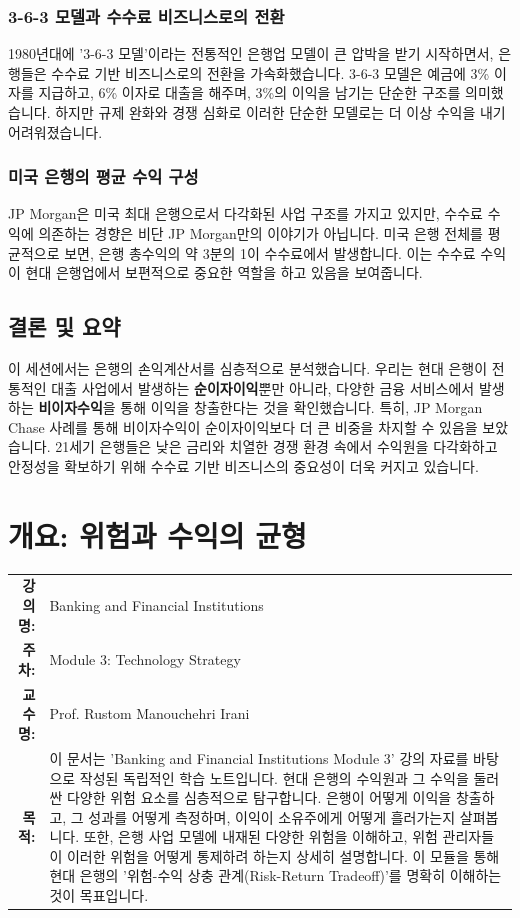 \documentclass[11pt,a4paper]{book}
\makeatletter
\theoremstyle{definition}
\newcommand{\metainfo}[4]{
\begin{tcolorbox}[
    colback=lightpurple,
    colframe=darkpurple,
    boxrule=1pt,
    arc=2mm,
    left=10pt,
    right=10pt,
    top=8pt,
    bottom=8pt
]
\begin{tabular}{@{}rl@{}}
\textbf{강의명:} & #1 \\[0.3em]
\textbf{주차:} & #2 \\[0.3em]
\textbf{교수명:} & #3 \\[0.3em]
\textbf{목적:} & \begin{minipage}[t]{0.75\textwidth}#4\end{minipage}
\end{tabular}
\end{tcolorbox}
}
\makeatother
\begin{document}
\subsection{3-6-3 모델과 수수료 비즈니스로의 전환}

1980년대에 '3-6-3 모델'이라는 전통적인 은행업 모델이 큰 압박을 받기 시작하면서, 은행들은 수수료 기반 비즈니스로의 전환을 가속화했습니다. 3-6-3 모델은 예금에 3\% 이자를 지급하고, 6\% 이자로 대출을 해주며, 3\%의 이익을 남기는 단순한 구조를 의미했습니다. 하지만 규제 완화와 경쟁 심화로 이러한 단순한 모델로는 더 이상 수익을 내기 어려워졌습니다.

\subsection{미국 은행의 평균 수익 구성}

JP Morgan은 미국 최대 은행으로서 다각화된 사업 구조를 가지고 있지만, 수수료 수익에 의존하는 경향은 비단 JP Morgan만의 이야기가 아닙니다. 미국 은행 전체를 평균적으로 보면, 은행 총수익의 약 3분의 1이 수수료에서 발생합니다. 이는 수수료 수익이 현대 은행업에서 보편적으로 중요한 역할을 하고 있음을 보여줍니다.


\section{결론 및 요약}

\begin{summarybox}[title={핵심 정리}]
이 세션에서는 은행의 손익계산서를 심층적으로 분석했습니다. 우리는 현대 은행이 전통적인 대출 사업에서 발생하는 \textbf{순이자이익}뿐만 아니라, 다양한 금융 서비스에서 발생하는 \textbf{비이자수익}을 통해 이익을 창출한다는 것을 확인했습니다. 특히, JP Morgan Chase 사례를 통해 비이자수익이 순이자이익보다 더 큰 비중을 차지할 수 있음을 보았습니다. 21세기 은행들은 낮은 금리와 치열한 경쟁 환경 속에서 수익원을 다각화하고 안정성을 확보하기 위해 수수료 기반 비즈니스의 중요성이 더욱 커지고 있습니다.
\end{summarybox}


\chapter{개요: 위험과 수익의 균형}
\label{ch:module3}

\metainfo{Banking and Financial Institutions}{Module 3: Technology Strategy}{Prof. Rustom Manouchehri Irani}{이 문서는 'Banking and Financial Institutions Module 3' 강의 자료를 바탕으로 작성된 독립적인 학습 노트입니다. 현대 은행의 수익원과 그 수익을 둘러싼 다양한 위험 요소를 심층적으로 탐구합니다. 은행이 어떻게 이익을 창출하고, 그 성과를 어떻게 측정하며, 이익이 소유주에게 어떻게 흘러가는지 살펴봅니다. 또한, 은행 사업 모델에 내재된 다양한 위험을 이해하고, 위험 관리자들이 이러한 위험을 어떻게 통제하려 하는지 상세히 설명합니다. 이 모듈을 통해 현대 은행의 '위험-수익 상충 관계(Risk-Return Tradeoff)'를 명확히 이해하는 것이 목표입니다.}
\end{document}
